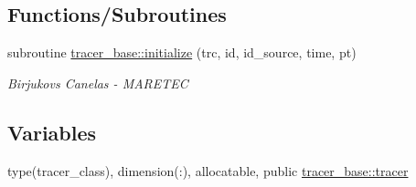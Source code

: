 \subsection*{Functions/\+Subroutines}
\begin{DoxyCompactItemize}
\item 
subroutine \hyperlink{namespacetracer__base_ad712d20080a9daa44024d61afae670a4}{tracer\+\_\+base\+::initialize} (trc, id, id\+\_\+source, time, pt)
\begin{DoxyCompactList}\small\item\em Birjukovs Canelas -\/ M\+A\+R\+E\+T\+EC \end{DoxyCompactList}\end{DoxyCompactItemize}
\subsection*{Variables}
\begin{DoxyCompactItemize}
\item 
type(tracer\+\_\+class), dimension(\+:), allocatable, public \hyperlink{namespacetracer__base_a7f839546575f08e3b944dafdf5e0b2d2}{tracer\+\_\+base\+::tracer}
\end{DoxyCompactItemize}
